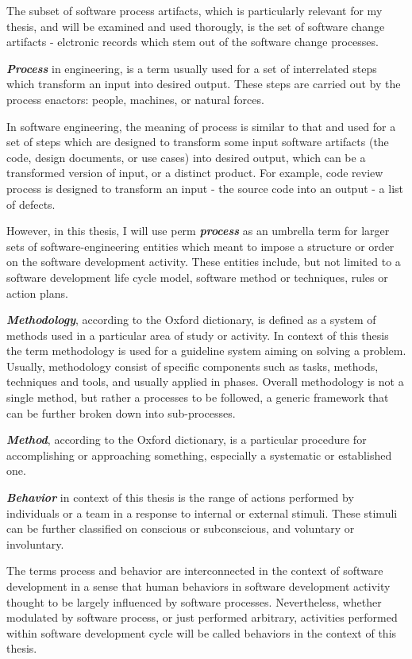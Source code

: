 The subset of software process artifacts, which is particularly relevant for my thesis, 
and will be examined and used thorougly, is the set of software change artifacts - 
elctronic records which stem out of the software change processes.

\textit{\textbf{Process}} in engineering, is a term usually used for a set of interrelated 
steps which transform an input into desired output. These steps are carried out by the process
enactors: people, machines, or natural forces. 

In software engineering, the meaning of process is similar to that and used for a set of steps 
which are designed to transform some input software artifacts (the code, design documents, 
or use cases) into desired output, which can be a transformed version of input, or a
distinct product. For example, code review process is designed to transform an input - the 
source code into an output - a list of defects.

However, in this thesis, I will use perm \textit{\textbf{process}} as an umbrella term for 
larger sets of software-engineering entities which meant to impose a structure or order on
the software development activity. These entities include, but not limited to a software 
development life cycle model, software method or techniques, rules or action plans. 

\textit{\textbf{Methodology}}, according to the Oxford dictionary, is defined as a system of 
methods used in a particular area of study or activity. In context of this thesis the 
term methodology is used for a guideline system aiming on solving a problem. Usually, 
methodology consist of specific components such as tasks, methods, techniques and tools, 
and usually applied in phases. Overall methodology is not a single method, but rather 
a processes to be followed, a generic framework that can be further broken down into 
sub-processes.

\textit{\textbf{Method}}, according to the Oxford dictionary, is a particular procedure for 
accomplishing or approaching something, especially a systematic or established one.

\textit{\textbf{Behavior}} in context of this thesis is the range of actions performed by 
individuals or a team in a response to internal or external stimuli. These stimuli can be
further classified on conscious or subconscious, and voluntary or involuntary. 

The terms process and behavior are interconnected in the context of software development
in a sense that human behaviors in software development activity thought to be largely influenced 
by software processes. Nevertheless, whether modulated by software process, or just 
performed arbitrary, activities performed within software development cycle will be called 
behaviors in the context of this thesis.

